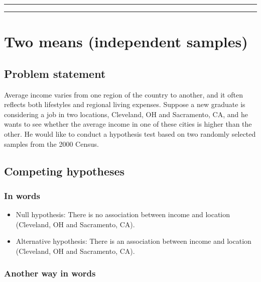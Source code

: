 \documentclass[12pt, krantz2,]{krantz}
\begin{document}
\begin{center}\rule{0.5\linewidth}{\linethickness}\end{center}

\begin{center}\rule{0.5\linewidth}{\linethickness}\end{center}

\hypertarget{two-means-independent-samples}{%
\section{Two means (independent samples)}\label{two-means-independent-samples}}

\hypertarget{problem-statement-3}{%
\subsection{Problem statement}\label{problem-statement-3}}

Average income varies from one region of the country to
another, and it often reflects both lifestyles and regional living expenses. Suppose a new graduate
is considering a job in two locations, Cleveland, OH and Sacramento, CA, and he wants to see
whether the average income in one of these cities is higher than the other. He would like to conduct
a hypothesis test based on two randomly selected samples from the 2000 Census. \citep[Tweaked a bit from][ {[}Chapter 5{]}]{isrs2014}

\hypertarget{competing-hypotheses-3}{%
\subsection{Competing hypotheses}\label{competing-hypotheses-3}}

\hypertarget{in-words-3}{%
\subsubsection*{In words}\label{in-words-3}}


\begin{itemize}
\item
  Null hypothesis: There is no association between income and location (Cleveland, OH and Sacramento, CA).
\item
  Alternative hypothesis: There is an association between income and location (Cleveland, OH and Sacramento, CA).
\end{itemize}

\hypertarget{another-way-in-words-1}{%
\subsubsection*{Another way in words}\label{another-way-in-words-1}}
\end{document}
